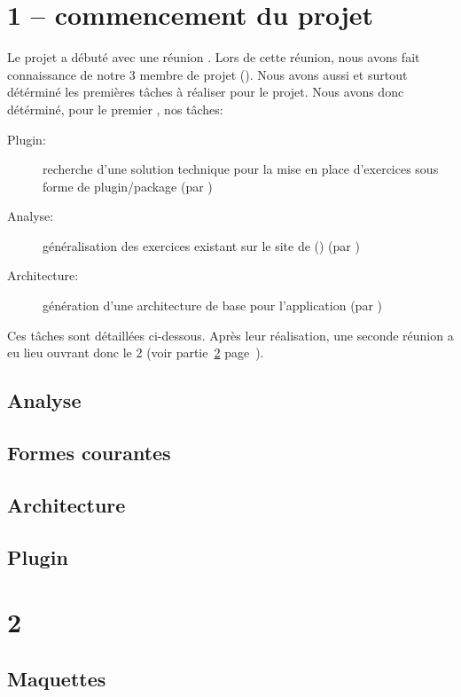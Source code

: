 \documentclass[french]{report}
\begin{document}
\section{1\ier{} \sprint{} -- commencement du projet}
\label{sprint1}
Le projet a débuté avec une réunion%
. Lors de cette réunion, nous avons fait connaissance de notre 3\ieme{} membre de projet (\etudiantSL{}). Nous avons aussi et surtout détérminé les premières t\^{a}ches à réaliser pour le projet.
Nous avons donc détérminé, pour le premier \sprint{}, nos t\^aches:
\begin{description}
	\item[Plugin:] recherche d'une solution technique pour la mise en place d'exercices sous forme de plugin/package (par \etudiantSL{})
	\item[Analyse:] \og{}généralisation\fg{} des exercices existant sur le site de \pepit{} (\pepitSite{}) (par \etudiantRD{})
	\item[Architecture:] génération d'une architecture de base pour l'application (par \etudiantJP{})
\end{description}
Ces tâches sont détaillées ci-dessous. Après leur réalisation, une seconde réunion a eu lieu ouvrant donc le 2\ieme{} \sprint{} (voir partie~\ref{sprint2} page~\pageref{sprint2}).
\subsection{Analyse}
\label{partie_analyse}

\subsection{Formes courantes}
\label{partie_formes_courantes}

\subsection{Architecture}
\label{partie_architecture}

\subsection{Plugin}
\label{partie_plugin}

\section{2\ieme{} \sprint{}}
\label{sprint2}
\subsection{Maquettes}
\label{partie_maquettes}

\end{document}
